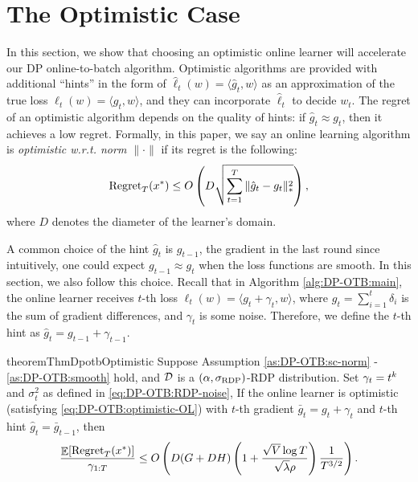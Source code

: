 \section{The Optimistic Case}
\label{sec:DP-OTB_optimistic}

In this section, we show that choosing an optimistic online learner \citep{chiang2012online, rakhlin2013online, steinhardt2014adaptivity} will accelerate our DP online-to-batch algorithm. Optimistic algorithms  are provided with additional ``hints'' in the form of $\hat \ell_t(w)=\langle \hat g_t, w\rangle$ as an approximation of the true loss $\ell_t(w)=\langle g_t,w\rangle$, and they can incorporate $\hat \ell_t$ to decide $w_t$. The regret of an optimistic algorithm depends on the quality of hints: if $\hat{g}_t\approx g_t$, then it achieves a low regret.  Formally, in this paper, we say an online learning algorithm is \textit{optimistic w.r.t. norm $\|\cdot\|$} if its regret is the following:
\begin{equation}
    \mathrm{Regret}_T(x^*) \leq O\left( D\sqrt{\sum_{t=1}^T \| \hat{g}_t - g_t\|_*^2 } \right), 
    \label{eq:DP-OTB:optimistic-OL}
\end{equation}
where $D$ denotes the diameter of the learner's domain.

A common choice of the hint $\hat{g}_t$ is $g_{t-1}$, the gradient in the last round since intuitively, one could expect $g_{t-1}\approx g_t$ when the loss functions are smooth. In this section, we also follow this choice. Recall that in Algorithm \ref{alg:DP-OTB:main}, the online learner receives $t$-th loss $\ell_t(w) = \langle g_t+\gamma_t, w\rangle$, where $g_t=\sum_{i=1}^t\delta_i$ is the sum of gradient differences, and $\gamma_t$ is some noise. Therefore, we define the $t$-th hint as $\hat{g}_t = g_{t-1}+\gamma_{t-1}$.

\begin{restatable}{theorem}{ThmDpotbOptimistic}
\label{thm:DP-OTB:optimistic}
Suppose Assumption \ref{as:DP-OTB:sc-norm} - \ref{as:DP-OTB:smooth} hold, and ${\cal D}$ is a $(\alpha,\sigma_{\mathrm{RDP}})$-RDP distribution. Set $\gamma_t=t^k$ and $\sigma_t^2$ as defined in \eqref{eq:DP-OTB:RDP-noise},
If the online learner is optimistic (satisfying \eqref{eq:DP-OTB:optimistic-OL}) with $t$-th gradient $\bar{g}_t=g_t+\gamma_t$ and $t$-th hint $\hat{g}_t=\bar{g}_{t-1}$, then
\begin{align*}
    \frac{\mathop{\mathbb{E}}[\mathrm{Regret}_T(x^*)]}{\gamma_{1:T}} 
    \leq O\left( D(G+DH)\left(1+\frac{\sqrt{V}\log T}{\sqrt{\lambda}\rho}\right)\frac{1}{T^{3/2}} \right).
\end{align*}
\end{restatable}

